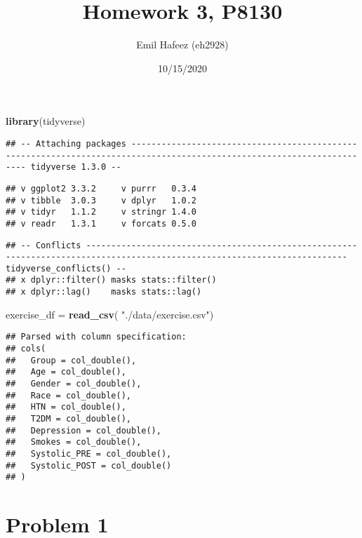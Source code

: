 \documentclass[
]{article}
\title{Homework 3, P8130}
\author{Emil Hafeez (eh2928)}
\date{10/15/2020}
\newenvironment{Shaded}{\begin{snugshade}}{\end{snugshade}}
\newcommand{\KeywordTok}[1]{\textcolor[rgb]{0.13,0.29,0.53}{\textbf{#1}}}
\newcommand{\NormalTok}[1]{#1}
\newcommand{\StringTok}[1]{\textcolor[rgb]{0.31,0.60,0.02}{#1}}
\begin{document}
\maketitle

\begin{Shaded}
\begin{Highlighting}[]
\KeywordTok{library}\NormalTok{(tidyverse)}
\end{Highlighting}
\end{Shaded}

\begin{verbatim}
## -- Attaching packages ----------------------------------------------------------------------------------------------------------------------- tidyverse 1.3.0 --
\end{verbatim}

\begin{verbatim}
## v ggplot2 3.3.2     v purrr   0.3.4
## v tibble  3.0.3     v dplyr   1.0.2
## v tidyr   1.1.2     v stringr 1.4.0
## v readr   1.3.1     v forcats 0.5.0
\end{verbatim}

\begin{verbatim}
## -- Conflicts -------------------------------------------------------------------------------------------------------------------------- tidyverse_conflicts() --
## x dplyr::filter() masks stats::filter()
## x dplyr::lag()    masks stats::lag()
\end{verbatim}

\begin{Shaded}
\begin{Highlighting}[]
\NormalTok{exercise_df =}
\StringTok{  }\KeywordTok{read_csv}\NormalTok{(}
      \StringTok{"./data/exercise.csv"}\NormalTok{)}
\end{Highlighting}
\end{Shaded}

\begin{verbatim}
## Parsed with column specification:
## cols(
##   Group = col_double(),
##   Age = col_double(),
##   Gender = col_double(),
##   Race = col_double(),
##   HTN = col_double(),
##   T2DM = col_double(),
##   Depression = col_double(),
##   Smokes = col_double(),
##   Systolic_PRE = col_double(),
##   Systolic_POST = col_double()
## )
\end{verbatim}

\hypertarget{problem-1}{%
\section{Problem 1}\label{problem-1}}
\end{document}
